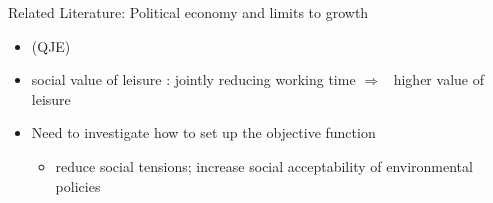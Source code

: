 \documentclass[11pt,aspectratio=169]{beamer}
\newcommand{\tr}[1]{\textcolor{blue}{#1}}
\newcommand{\ar}{$\Rightarrow$ \ }
\begin{document}
\begin{frame}{Related Literature: Political economy and limits to growth}
\begin{itemize}
\item \cite{Alesina1994DistributiveGrowth}(QJE)

\item social value of leisure \citep{Alesina2005WorkDifferent}: jointly reducing working time \ar higher value of leisure
\item \alert{Need to investigate how to set up the objective function} 
\begin{itemize}
\item reduce social tensions; increase social acceptability of environmental policies
\end{itemize}
\end{itemize}

\end{frame}
\end{document}
